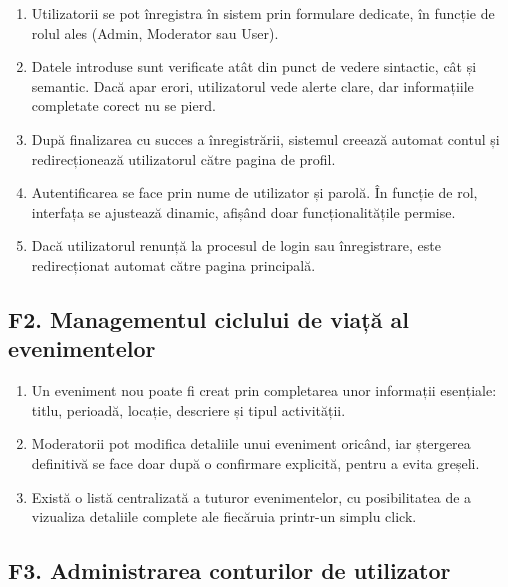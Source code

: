 \documentclass[11pt]{article}
\begin{document}
\begin{enumerate}[label=\textbf{F1.\arabic*}]
    \item Utilizatorii se pot înregistra în sistem prin formulare dedicate, în funcție de rolul ales (Admin, Moderator sau User).
    
    \item Datele introduse sunt verificate atât din punct de vedere sintactic, cât și semantic. Dacă apar erori, utilizatorul vede alerte clare, dar informațiile completate corect nu se pierd.
    
    \item După finalizarea cu succes a înregistrării, sistemul creează automat contul și redirecționează utilizatorul către pagina de profil.
    
    \item Autentificarea se face prin nume de utilizator și parolă. În funcție de rol, interfața se ajustează dinamic, afișând doar funcționalitățile permise.
    
    \item Dacă utilizatorul renunță la procesul de login sau înregistrare, este redirecționat automat către pagina principală.
\end{enumerate}

\subsection*{F2. Managementul ciclului de viață al evenimentelor}

\begin{enumerate}[label=\textbf{F2.\arabic*}]
    \item Un eveniment nou poate fi creat prin completarea unor informații esențiale: titlu, perioadă, locație, descriere și tipul activității.
    
    \item Moderatorii pot modifica detaliile unui eveniment oricând, iar ștergerea definitivă se face doar după o confirmare explicită, pentru a evita greșeli.
    
    \item Există o listă centralizată a tuturor evenimentelor, cu posibilitatea de a vizualiza detaliile complete ale fiecăruia printr-un simplu click.
\end{enumerate}

\subsection*{F3. Administrarea conturilor de utilizator}
\end{document}
